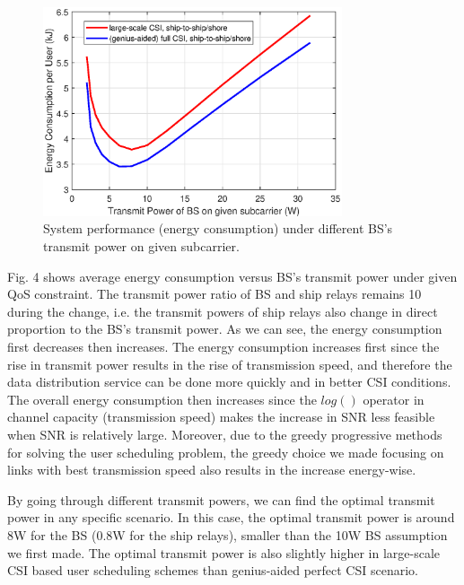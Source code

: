 \documentclass[journal]{IEEEtran}
\begin{document}
 \begin{figure} [htb]
 \begin{center}
 \includegraphics*[width=8.8cm]{snrs.eps}
 \end{center}
 \vspace*{-4mm} 
 \caption{System performance (energy consumption) under different BS's transmit power on given subcarrier.}\label{fig:5}
 \vspace*{-2mm} 
 \end{figure}

 Fig. 4 shows average energy consumption versus BS's transmit power under given QoS constraint. The transmit power ratio of BS and ship relays remains 10 during the change, i.e. the transmit powers of ship relays also change in direct proportion to the BS's transmit power. 
 As we can see, the energy consumption first decreases then increases. 
 The energy consumption increases first since the rise in transmit power results in the rise of transmission speed, and therefore the data distribution service can be done more quickly and in better CSI conditions. 
 The overall energy consumption then increases since the $log\left({}\right)$ operator in channel capacity (transmission speed) makes the increase in SNR less feasible when SNR is relatively large. Moreover, due to the greedy progressive methods for solving the user scheduling problem, the greedy choice we made focusing on links with best transmission speed also results in the increase energy-wise. 
 
 By going through different transmit powers, we can find the optimal transmit power in any specific scenario. In this case, the optimal transmit power is around 8W for the BS (0.8W for the ship relays), smaller than the 10W BS assumption we first made. The optimal transmit power is also slightly higher in large-scale CSI based user scheduling schemes than genius-aided perfect CSI scenario. 
 
\end{document}
